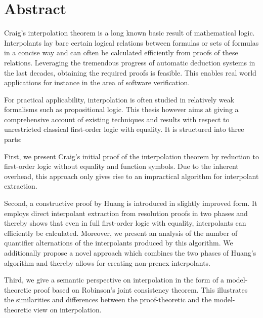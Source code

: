 \chapter*{Abstract}

Craig's interpolation theorem is a long known basic result of mathematical logic.
Interpolants lay bare certain logical relations between formulas or sets of formulas in a concise way and can often be calculated efficiently from proofs of these relations.
Leveraging the tremendous
progress of automatic deduction systems in the last decades, obtaining the required proofs
is feasible. 
This enables real world applications for instance in the area of software verification.

For practical applicability, interpolation is often studied in relatively weak formalisms such as propositional logic.
This thesis however aims at giving a comprehensive account of existing techniques and results with respect to unrestricted classical first-order logic with equality. It is structured into three\nolinebreak{} parts:

First, we present Craig's initial proof of the interpolation theorem by reduction to first-order logic without equality and function symbols.
Due to the inherent overhead,
this approach only gives rise to an impractical algorithm for interpolant extraction.

Second, a constructive proof by Huang is introduced in slightly improved form.
It employs direct interpolant extraction from resolution proofs in two phases 
and thereby
shows that even in full first-order logic with equality, interpolants can efficiently be calculated.
Moreover, we present an analysis of the number of quantifier alternations of the interpolants produced by this algorithm.
We additionally propose a novel approach which combines the two phases of Huang's algorithm and thereby allows for creating non-prenex interpolants.

Third, we give a semantic perspective on interpolation in the form of a model-theoretic proof based on Robinson's joint consistency theorem.
This illustrates the similarities and differences between
the proof-theoretic and the model-theoretic view on interpolation.
